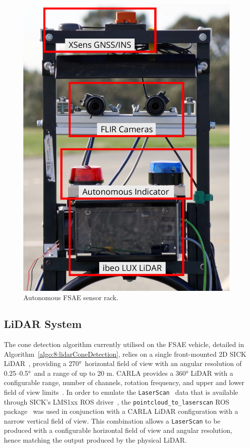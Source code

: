\begin{figure}[H] %
	\centering
	\includegraphics[width=0.45\linewidth]{sensorRack}
	\caption{Autonomous FSAE sensor rack.}
	\label{fig:8:sensorRack}
\end{figure}

\subsection{LiDAR System} \label{subsec:8:lidarSystem}
The cone detection algorithm currently utilised on the FSAE vehicle, detailed in Algorithm~\ref{algo:8:lidarConeDetection}, relies on a single front-mounted 2D SICK LiDAR~\cite{sick_ag_lms111-10100_nodate}, providing a \ang{270}\ horizontal field of view with an angular resolution of 0.25--\ang{0.5}\ and a range of up to 20 m.
CARLA provides a \ang{360} LiDAR with a configurable range, number of channels, rotation frequency, and upper and lower field of view limits~\cite{carla_cameras_nodate}.
In order to emulate the \texttt{LaserScan}~\cite{ros_sensor_msgs/laserscan_nodate} data that is available through SICK's LMS1xx ROS driver~\cite{ros_lms1xx_nodate}, the \texttt{pointcloud\_to\_laserscan} ROS package~\cite{ros_pointcloud_to_laserscan_nodate} was used in conjunction with a CARLA LiDAR configuration with a narrow vertical field of view.
This combination allows a \texttt{LaserScan} to be produced with a configurable horizontal field of view and angular resolution, hence matching the output produced by the physical LiDAR.

